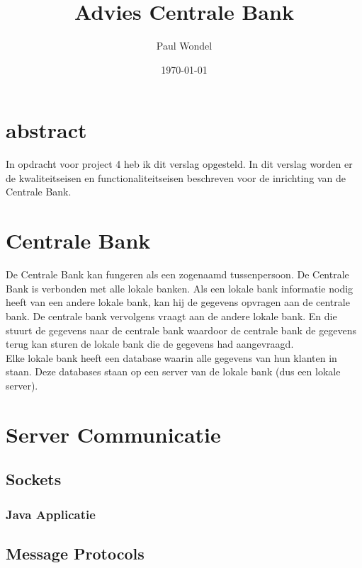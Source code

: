\documentclass{article}
\begin{document}
\title{Advies Centrale Bank}
\author{Paul Wondel}
\date{\today}
\maketitle

\section{abstract}
In opdracht voor project 4 heb ik dit verslag opgesteld.
In dit verslag worden er de kwaliteitseisen en functionaliteitseisen
beschreven voor de inrichting van de Centrale Bank.

\clearpage
\newpage

\tableofcontents

\clearpage
\newpage

\section{Centrale Bank}
De Centrale Bank kan fungeren als een zogenaamd tussenpersoon.
De Centrale Bank is verbonden met alle lokale banken.
Als een lokale bank informatie nodig heeft van een andere lokale bank,
kan hij de gegevens opvragen aan de centrale bank.
De centrale bank vervolgens vraagt aan de andere lokale bank.
En die stuurt de gegevens naar de centrale bank waardoor de centrale bank
de gegevens terug kan sturen de lokale bank die de gegevens had aangevraagd.\\

Elke lokale bank heeft een database waarin alle gegevens van hun klanten in staan.
Deze databases staan op een server van de lokale bank (dus een lokale server).



\section{Server Communicatie}
 

\subsection{Sockets}

\subsubsection{Java Applicatie}

\subsection{Message Protocols}
\end{document}
